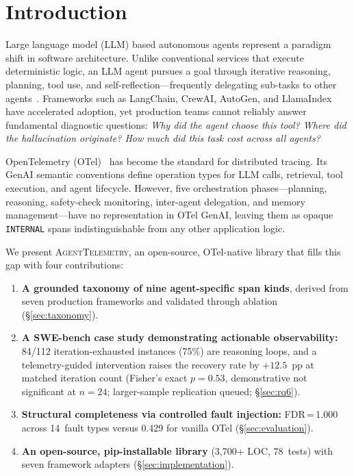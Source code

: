 \documentclass{article}
\begin{document}
\section{Introduction}
\label{sec:introduction}

Large language model (LLM) based autonomous agents represent a paradigm
shift in software architecture.  Unlike conventional services that
execute deterministic logic, an LLM agent pursues a goal through
iterative reasoning, planning, tool use, and
self-reflection---frequently delegating sub-tasks to other
agents~\citep{agentbench,agentboard}.  Frameworks such as LangChain,
CrewAI, AutoGen, and LlamaIndex have accelerated adoption, yet
production teams cannot reliably answer fundamental diagnostic
questions: \emph{Why did the agent choose this tool? Where did the
hallucination originate? How much did this task cost across all agents?}

OpenTelemetry (OTel)~\citep{otel} has become the standard for
distributed tracing.  Its GenAI semantic conventions define operation
types for LLM calls, retrieval, tool execution, and agent lifecycle.
However, five orchestration phases---planning, reasoning, safety-check
monitoring, inter-agent delegation, and memory management---have no
representation in OTel GenAI, leaving them as opaque
\texttt{INTERNAL} spans indistinguishable from any other application
logic.

We present \textsc{AgentTelemetry}, an open-source, OTel-native
library that fills this gap with four contributions:

\begin{enumerate}[leftmargin=*,nosep]
\item \textbf{A grounded taxonomy of nine agent-specific span kinds},
  derived from seven production frameworks and validated through
  ablation (\S\ref{sec:taxonomy}).

\item \textbf{A SWE-bench case study demonstrating actionable
  observability:} 84/112 iteration-exhausted instances (75\%) are
  reasoning loops, and a telemetry-guided intervention raises the
  recovery rate by $+12.5$~pp at matched iteration count
  (Fisher's exact $p{=}0.53$, demonstrative not significant at $n{=}24$;
  larger-sample replication queued; \S\ref{sec:rq6}).

\item \textbf{Structural completeness via controlled fault injection:}
  FDR\,=\,1.000 across 14~fault types versus 0.429 for vanilla
  OTel (\S\ref{sec:evaluation}).

\item \textbf{An open-source, pip-installable library} (3,700+ LOC,
  78~tests) with seven framework adapters (\S\ref{sec:implementation}).
\end{enumerate}
\end{document}
